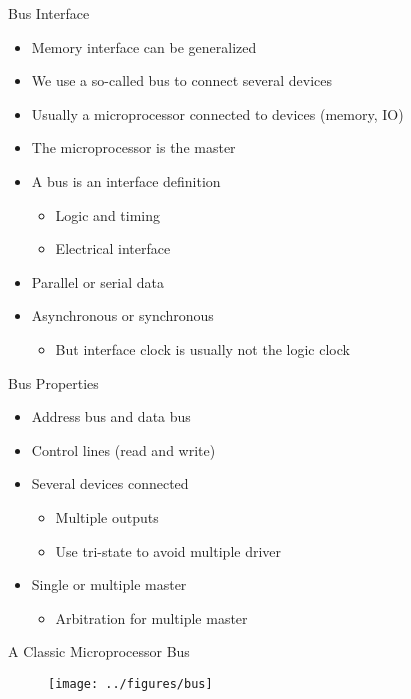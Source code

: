 \begin{frame}[fragile]{Bus Interface}
\begin{itemize}
\item Memory interface can be generalized
\item We use a so-called bus to connect several devices
\item Usually a microprocessor connected to devices (memory, IO)
\item The microprocessor is the master
\item A bus is an interface definition
\begin{itemize}
\item Logic and timing
\item Electrical interface
\end{itemize}
\item Parallel or serial data
\item Asynchronous or synchronous
\begin{itemize}
\item But interface clock is usually not the logic clock
\end{itemize}
\end{itemize}
\end{frame}

\begin{frame}[fragile]{Bus Properties}
\begin{itemize}
\item Address bus and data bus
\item Control lines (read and write)
\item Several devices connected
\begin{itemize}
\item Multiple outputs
\item Use tri-state to avoid multiple driver
\end{itemize}
\item Single or multiple master
\begin{itemize}
\item Arbitration for multiple master
\end{itemize}
\end{itemize}
\end{frame}

\begin{frame}[fragile]{A Classic Microprocessor Bus}
\begin{figure}
  \texttt{[image: ../figures/bus]}
\end{figure}
\end{frame}



